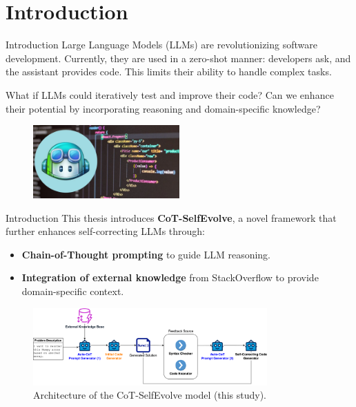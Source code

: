\section{Introduction}

\begin{frame}{Introduction}
    Large Language Models (LLMs) are revolutionizing software development. Currently, they are used in a zero-shot manner: developers ask, and the assistant provides code. This limits their ability to handle complex tasks.

    \vspace{0.5cm}

    What if LLMs could iteratively test and improve their code? Can we enhance their potential by incorporating reasoning and domain-specific knowledge?

    \begin{figure}[!htb]
        \centering
        \includegraphics[width=0.5\textwidth]{img/llm_for_coding}
    \end{figure}
\end{frame}

\begin{frame}{Introduction}
    This thesis introduces \textbf{CoT-SelfEvolve}, a novel framework that further enhances self-correcting LLMs through:

    \begin{itemize}
        \item \textbf{Chain-of-Thought prompting} to guide LLM reasoning.
        \item \textbf{Integration of external knowledge} from StackOverflow to provide domain-specific context.
    \end{itemize}

    \begin{figure}[!htb]
        \centering
        \includegraphics[width=0.8\textwidth]{img/cot_selfevolve_architecture}
        \captionsetup{font=small,labelformat=empty}
        \caption{Architecture of the CoT-SelfEvolve model (this study).}
    \end{figure}
\end{frame}
